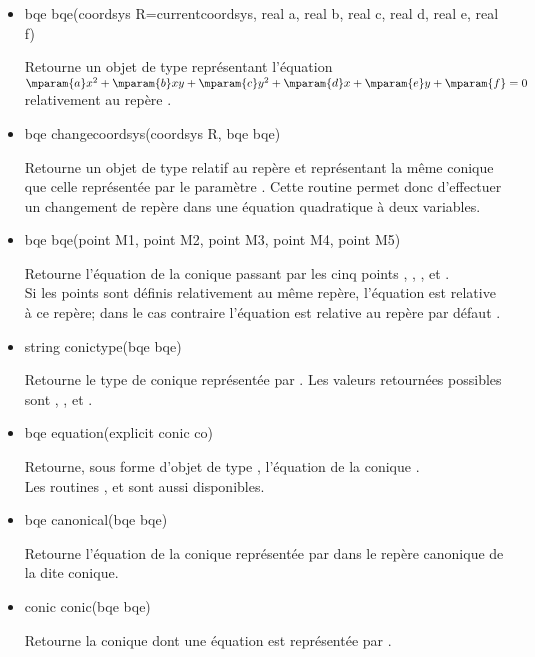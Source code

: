\documentclass[pdftex]{article}
\begin{document}
\begin{itemize}
\item {}
  \begin{Vcolor}
    bqe bqe(coordsys R=currentcoordsys, real a, real b, real c, real d, real e, real f)
  \end{Vcolor}
  Retourne un objet de type  représentant l'équation
  $\mparam{a}x^2 + \mparam{b}xy + \mparam{c}y^2 + \mparam{d}x + \mparam{e}y + \mparam{f}=0$
  relativement au repère .
\item {}
  \begin{Vcolor}
    bqe changecoordsys(coordsys R, bqe bqe)
  \end{Vcolor}
  Retourne un objet de type  relatif au repère  et
  représentant la même conique que celle représentée par le
  paramètre . Cette routine permet donc d'effectuer un
  changement de repère dans une équation quadratique à deux variables.
\item {}
  \begin{Vcolor}
    bqe bqe(point M1, point M2, point M3, point M4, point M5)
  \end{Vcolor}
  Retourne l'équation de la conique passant par les cinq
  points , , , 
  et .\\
  Si les points sont définis relativement au même repère, l'équation
  est relative à ce repère; dans le cas contraire l'équation est
  relative au repère par défaut .
\item {}
  \begin{Vcolor}
    string conictype(bqe bqe)
  \end{Vcolor}
  Retourne le type de conique représentée par . Les valeurs
  retournées possibles sont , ,
   et .
\item {}
  \begin{Vcolor}
    bqe equation(explicit conic co)
  \end{Vcolor}
  Retourne, sous forme d'objet de type , l'équation de la
  conique .\\
  Les routines ,  et
   sont aussi disponibles.
\item {}
  \begin{Vcolor}
    bqe canonical(bqe bqe)
  \end{Vcolor}
  Retourne l'équation de la conique représentée par  dans
  le repère canonique de la dite conique.
\item {}
  \begin{Vcolor}
    conic conic(bqe bqe)
  \end{Vcolor}
  Retourne la conique dont une équation est représentée par .
\end{itemize}
\end{document}
